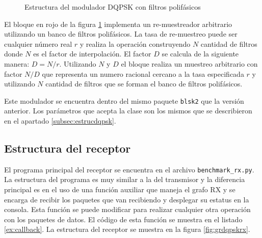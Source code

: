 \begin{figure}[htp]
  \centering
  \vspace{0.5in}
  \vspace{0.3in}
  \caption{Estructura del modulador DQPSK con filtros polif\'asicos}
  \label{fig:dqpsk2}
\end{figure}

El bloque en rojo de la figura \ref{fig:dqpsk2} implementa un re-muestreador arbitrario utilizando un banco de filtros
polif\'asicos. La tasa de re-muestreo puede ser cualquier n\'umero real $r$ y realiza la operaci\'on construyendo $N$
cantidad de filtros donde $N$ es el factor de interpolaci\'on. El factor $D$ se calcula de la siguiente manera: $D=N/r$.
Utilizando $N$ y $D$ el bloque realiza un muestreo arbitrario con factor $N/D$ que representa un numero racional cercano a
la tasa especificada $r$ y utilizando $N$ cantidad de filtros que se forman el banco de filtros polif\'asicos.

Este modulador se encuentra dentro del mismo paquete \verb|blsk2| que la versi\'on anterior. Los par\'ametros que acepta la
clase son los mismos que se describieron en el apartado \ref{subsec:estrucdqpsk}.

\subsection{Estructura del receptor}
El programa principal del receptor se encuentra en el archivo \verb|benchmark_rx.py|. La estructura del programa es muy
similar a la del transmisor y la diferencia principal es en el uso de una funci\'on auxiliar que maneja el grafo RX y
se encarga de recibir los paquetes que van recibiendo y desplegar su estatus en la consola. Esta funci\'on se puede
modificar para realizar cualquier otra operaci\'on con los paquetes de datos. El c\'odigo de esta funci\'on se muestra
en el listado \ref{ex:callback}. La estructura del receptor se muestra en la figura \ref{fig:grdqpskrx}.

